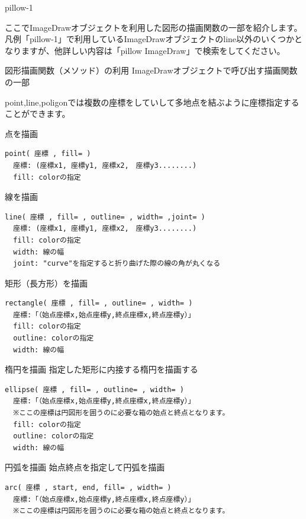 \documentclass[11pt,a4paper,dvipdfmx,titlepage]{jsreport}
\begin{document}
\begin{pabox}{pillow-1}
\end{pabox}

ここでImageDrawオブジェクトを利用した図形の描画関数の一部を紹介します。
凡例「pillow-1」で利用しているImageDrawオブジェクトのline以外のいくつかとなりますが、他詳しい内容は「pillow ImageDraw」で検索をしてください。

\begin{grabox}{図形描画関数（メソッド）の利用}
ImageDrawオブジェクトで呼び出す描画関数の一部

point,line,poligonでは複数の座標をしていして多地点を結ぶように座標指定することができます。

\begin{codebox}{点を描画}
\begin{verbatim}
point( 座標 , fill= )
  座標: (座標x1, 座標y1, 座標x2,　座標y3........)
  fill: colorの指定
\end{verbatim}
\end{codebox}
\begin{codebox}{線を描画}
\begin{verbatim}
line( 座標 , fill= , outline= , width= ,joint= )
  座標: (座標x1, 座標y1, 座標x2,　座標y3........)
  fill: colorの指定
  width: 線の幅
  joint: "curve"を指定すると折り曲げた際の線の角が丸くなる
\end{verbatim}
\end{codebox}
\begin{codebox}{矩形（長方形）を描画}
\begin{verbatim}
rectangle( 座標 , fill= , outline= , width= )
  座標:「（始点座標x,始点座標y,終点座標x,終点座標y）」
  fill: colorの指定
  outline: colorの指定
  width: 線の幅
\end{verbatim}
\end{codebox}
\begin{codebox}{楕円を描画}
指定した矩形に内接する楕円を描画する
\begin{verbatim}
ellipse( 座標 , fill= , outline= , width= )
  座標:「（始点座標x,始点座標y,終点座標x,終点座標y）」
  ※ここの座標は円図形を囲うのに必要な箱の始点と終点となります。
  fill: colorの指定
  outline: colorの指定
  width: 線の幅
\end{verbatim}
\end{codebox}
\begin{codebox}{円弧を描画}
始点終点を指定して円弧を描画
\begin{verbatim}
arc( 座標 , start, end, fill= , width= )
  座標:「（始点座標x,始点座標y,終点座標x,終点座標y）」
  ※ここの座標は円図形を囲うのに必要な箱の始点と終点となります。

\end{verbatim}
\end{codebox}
\end{grabox}
\end{document}
